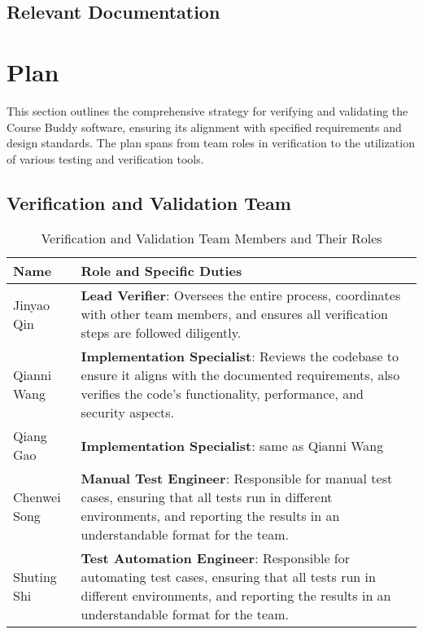 \documentclass[12pt, titlepage]{article}
\begin{document}
\subsection{Relevant Documentation}


\citet{SRS}


\section{Plan}

This section outlines the comprehensive strategy for verifying and validating the Course Buddy software, ensuring its alignment with specified requirements and design standards. The plan spans from team roles in verification to the utilization of various testing and verification tools.

\subsection{Verification and Validation Team}
     \begin{table}[H]
     \centering
     \begin{tabular}{l p{10cm}}
          \toprule
          \textbf{Name} & \textbf{Role and Specific Duties}\\
          \midrule
          Jinyao Qin & \textbf{Lead Verifier}: Oversees the entire process, coordinates with other team members, and ensures all verification steps are followed diligently.\\
          
          Qianni Wang & \textbf{Implementation Specialist}: Reviews the codebase to ensure it aligns with the documented requirements, also verifies the code's functionality, performance, and security aspects.\\
          
          Qiang Gao & \textbf{Implementation Specialist}: same as Qianni Wang\\
          
          Chenwei Song & \textbf{Manual Test Engineer}: Responsible for manual test cases, ensuring that all tests run in different environments, and reporting the results in an understandable format for the team.\\
          
          Shuting Shi & \textbf{Test Automation Engineer}: Responsible for automating test cases, ensuring that all tests run in different environments, and reporting the results in an understandable format for the team.\\
          \bottomrule
        \end{tabular}
     \caption{Verification and Validation Team Members and Their Roles}
     \end{table}
\end{document}

